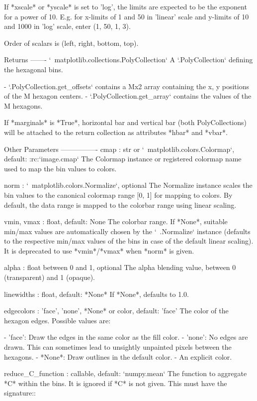 \begin{DoxyVerb}
    If *xscale* or *yscale* is set to 'log', the limits are
    expected to be the exponent for a power of 10. E.g. for
    x-limits of 1 and 50 in 'linear' scale and y-limits
    of 10 and 1000 in 'log' scale, enter (1, 50, 1, 3).

    Order of scalars is (left, right, bottom, top).

Returns
-------
`~matplotlib.collections.PolyCollection`
    A `.PolyCollection` defining the hexagonal bins.

    - `.PolyCollection.get_offsets` contains a Mx2 array containing
      the x, y positions of the M hexagon centers.
    - `.PolyCollection.get_array` contains the values of the M
      hexagons.

    If *marginals* is *True*, horizontal
    bar and vertical bar (both PolyCollections) will be attached
    to the return collection as attributes *hbar* and *vbar*.

Other Parameters
----------------
cmap : str or `~matplotlib.colors.Colormap`, default: :rc:`image.cmap`
    The Colormap instance or registered colormap name used to map
    the bin values to colors.

norm : `~matplotlib.colors.Normalize`, optional
    The Normalize instance scales the bin values to the canonical
    colormap range [0, 1] for mapping to colors. By default, the data
    range is mapped to the colorbar range using linear scaling.

vmin, vmax : float, default: None
    The colorbar range. If *None*, suitable min/max values are
    automatically chosen by the `~.Normalize` instance (defaults to
    the respective min/max values of the bins in case of the default
    linear scaling).
    It is deprecated to use *vmin*/*vmax* when *norm* is given.

alpha : float between 0 and 1, optional
    The alpha blending value, between 0 (transparent) and 1 (opaque).

linewidths : float, default: *None*
    If *None*, defaults to 1.0.

edgecolors : {'face', 'none', *None*} or color, default: 'face'
    The color of the hexagon edges. Possible values are:

    - 'face': Draw the edges in the same color as the fill color.
    - 'none': No edges are drawn. This can sometimes lead to unsightly
      unpainted pixels between the hexagons.
    - *None*: Draw outlines in the default color.
    - An explicit color.

reduce_C_function : callable, default: `numpy.mean`
    The function to aggregate *C* within the bins. It is ignored if
    *C* is not given. This must have the signature::


\end{DoxyVerb}
